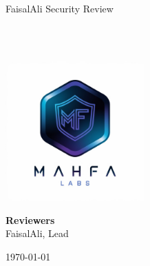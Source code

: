 \begin{titlepage}
  \vbox{}
  \vbox{}

  \begin{center}


    \noindent\makebox[\linewidth]{\rule{.7\paperwidth}{.6pt}}\\[0.7cm]

    { \huge \bfseries

      FaisalAli Security Review
    }\\[0.25cm]
    
    \noindent\makebox[\linewidth]{\rule{.7\paperwidth}{.6pt}}\\[0.7cm]

    
    \vfill

    \includegraphics[width=0.40\textwidth]{img/logo2.png}

    
    \large
    {\bfseries Reviewers}\\
    
    FaisalAli, Lead

    {\large \today}

  \end{center}

\end{titlepage}